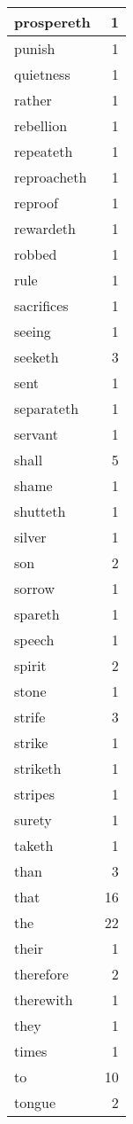\begin{center}
\begin{longtable}{l|r}
prospereth & 1\\ \hline 
punish & 1\\ \hline 
quietness & 1\\ \hline 
rather & 1\\ \hline 
rebellion & 1\\ \hline 
repeateth & 1\\ \hline 
reproacheth & 1\\ \hline 
reproof & 1\\ \hline 
rewardeth & 1\\ \hline 
robbed & 1\\ \hline 
rule & 1\\ \hline 
sacrifices & 1\\ \hline 
seeing & 1\\ \hline 
seeketh & 3\\ \hline 
sent & 1\\ \hline 
separateth & 1\\ \hline 
servant & 1\\ \hline 
shall & 5\\ \hline 
shame & 1\\ \hline 
shutteth & 1\\ \hline 
silver & 1\\ \hline 
son & 2\\ \hline 
sorrow & 1\\ \hline 
spareth & 1\\ \hline 
speech & 1\\ \hline 
spirit & 2\\ \hline 
stone & 1\\ \hline 
strife & 3\\ \hline 
strike & 1\\ \hline 
striketh & 1\\ \hline 
stripes & 1\\ \hline 
surety & 1\\ \hline 
taketh & 1\\ \hline 
than & 3\\ \hline 
that & 16\\ \hline 
the & 22\\ \hline 
their & 1\\ \hline 
therefore & 2\\ \hline 
therewith & 1\\ \hline 
they & 1\\ \hline 
times & 1\\ \hline 
to & 10\\ \hline 
tongue & 2\\ \hline 

\end{longtable}
\end{center}
